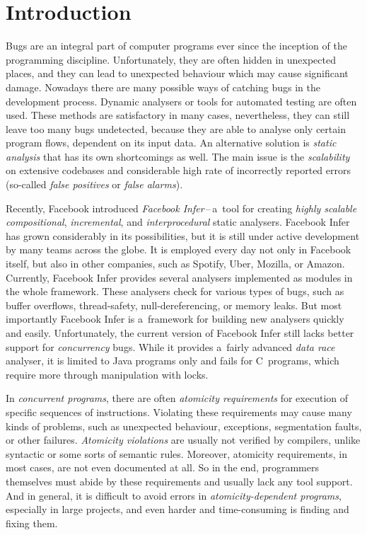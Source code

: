 

\chapter{Introduction}

Bugs are an integral part of computer programs ever since the inception
of the programming discipline. Unfortunately, they are often hidden
in unexpected places, and they can lead to unexpected behaviour which
may cause significant damage. Nowadays there are many possible
ways of catching bugs in the development process. Dynamic analysers
or tools for automated testing are often used. These methods
are satisfactory in many cases, nevertheless, they can still leave
too many bugs undetected, because they are able to analyse only
certain program flows, dependent on its input data. An alternative
solution is \emph{static analysis} that has its own shortcomings as 
well. The main issue is the \emph{scalability} on extensive codebases and
considerable high rate of incorrectly reported errors (so-called
\emph{false positives} or \emph{false alarms}).

Recently, Facebook introduced \emph{Facebook Infer}\,--\,a~tool for
creating \emph{highly scalable} \emph{compositional}, \emph{incremental},
and \emph{interprocedural} static analysers. Facebook Infer has grown
considerably in its possibilities, but it is still under active development 
by many teams across the globe. It is employed every day not only in
Facebook itself, but also in other companies, such as Spotify, Uber, Mozilla, 
or Amazon. Currently, Facebook Infer provides several analysers implemented
as modules in the whole framework. These analysers check for various types
of bugs, such as buffer overflows, thread-safety, null-dereferencing, or
memory leaks. But most importantly Facebook Infer is a~framework for building
new analysers quickly and easily. Unfortunately, the current version of 
Facebook Infer still lacks better support for \emph{concurrency} bugs. 
While it provides a~fairly advanced \emph{data race} analyser, it is 
limited to Java programs only and fails for C~programs, which require 
more through manipulation with locks.

In \emph{concurrent programs}, there are often \emph{atomicity requirements}
for execution of specific sequences of instructions. Violating these
requirements may cause many kinds of problems, such as unexpected
behaviour, exceptions, segmentation faults, or other failures.
\emph{Atomicity violations} are usually not verified by compilers,
unlike syntactic or some sorts of semantic rules. Moreover, atomicity
requirements, in most cases, are not even documented at all. So in the
end, programmers themselves must abide by these requirements and usually
lack any tool support. And in general, it is difficult to avoid
errors in \emph{atomicity-dependent programs}, especially in large projects, 
and even harder and time-consuming is finding and fixing them.

